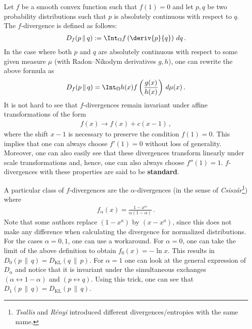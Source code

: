     \begin{example}
        Let $f$ be a smooth convex function such that $f(1)=0$ and let $p,q$ be two probability distributions such that $p$ is absolutely continuous with respect to $q$. The $f$-divergence is defined as follows:
        \begin{gather}
            D_f(p\,\|\,q) := \Int_\Omega f\left(\deriv{p}{q}\right)\,dq\,.
        \end{gather}
        In the case where both $p$ and $q$ are absolutely continuous with respect to some given measure $\mu$ (with Radon--Nikodym derivatives $g,h$), one can rewrite the above formula as
        \begin{gather}
            D_f(p\,\|\,q) = \Int_\Omega h(x)f\left(\frac{g(x)}{h(x)}\right)\,d\mu(x)\,.
        \end{gather}
        It is not hard to see that $f$-divergences remain invariant under affine transformations of the form
        \begin{gather}
            f(x)\longrightarrow f(x) + c(x-1)\,,
        \end{gather}
        where the shift $x-1$ is necessary to preserve the condition $f(1)=0$. This implies that one can always choose $f'(1)=0$ without loss of generality. Moreover, one can also easily see that these divergences transform linearly under scale transformations and, hence, one can also always choose $f''(1)=1$. $f$-divergences with these properties are said to be \textbf{standard}.

        A particular class of $f$-divergences are the $\alpha$-divergences (in the sense of \textit{Csisz\'ar}\footnote{\textit{Tsallis} and \textit{R\'enyi} introduced different divergences/entropies with the same name.}) where
        \begin{gather}
            f_\alpha(x) = \frac{1-x^\alpha}{\alpha(1-\alpha)}\,.
        \end{gather}
        Note that some authors replace $(1-x^a)$ by $(x-x^a)$, since this does not make any difference when calculating the divergence for normalized distributions. For the cases $\alpha=0,1$, one can use a workaround. For $\alpha=0$, one can take the limit of the above definition to obtain $f_0(x) = -\ln x$. This results in $D_0(p\,\|\,q) = D_{\text{KL}}(q\,\|\,p)$. For $\alpha=1$ one can look at the general expression of $D_\alpha$ and notice that it is invariant under the simultaneous exchanges $(\alpha\leftrightarrow1-\alpha)$ and $(p\leftrightarrow q)$. Using this trick, one can see that $D_1(p\,\|\,q) = D_{\text{KL}}(p\,\|\,q)$.
    \end{example}

